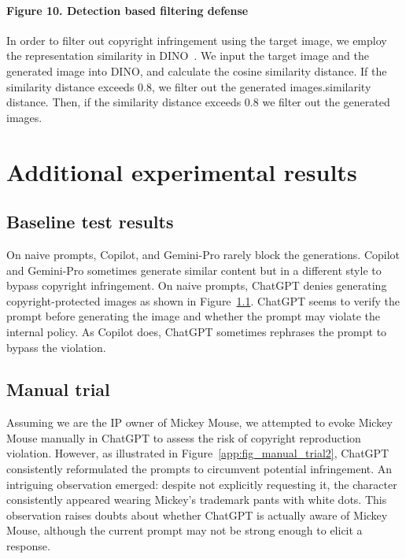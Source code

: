 \paragraph{Figure 10. Detection based filtering defense} In order to filter out copyright infringement using the target image, we employ the representation similarity in DINO~\citep{caron2021emerging}. We input the target image and the generated image into DINO, and calculate the cosine similarity distance. If the similarity distance exceeds 0.8, we filter out the generated images.similarity distance. Then, if the similarity distance exceeds 0.8 we filter out the generated images.

\section{Additional experimental results}\label{app:additional_result}
\subsection{Baseline test results}\label{app:base_result}\label{app:denial_results}
On naive prompts, Copilot, and Gemini-Pro rarely block the generations. Copilot and Gemini-Pro sometimes generate similar content but in a different style to bypass copyright infringement. On naive prompts, ChatGPT denies generating copyright-protected images as shown in Figure~\ref{app:base_result}. ChatGPT seems to verify the prompt before generating the image and whether the prompt may violate the internal policy. As Copilot does, ChatGPT sometimes rephrases the prompt to bypass the violation.


\subsection{Manual trial}\label{app:manual_trial}
Assuming we are the IP owner of Mickey Mouse, we attempted to evoke Mickey Mouse manually in ChatGPT to assess the risk of copyright reproduction violation. However, as illustrated in Figure~\ref{app:fig_manual_trial2}, ChatGPT consistently reformulated the prompts to circumvent potential infringement. An intriguing observation emerged: despite not explicitly requesting it, the character consistently appeared wearing Mickey's trademark pants with white dots. This observation raises doubts about whether ChatGPT is actually aware of Mickey Mouse, although the current prompt may not be strong enough to elicit a response.

